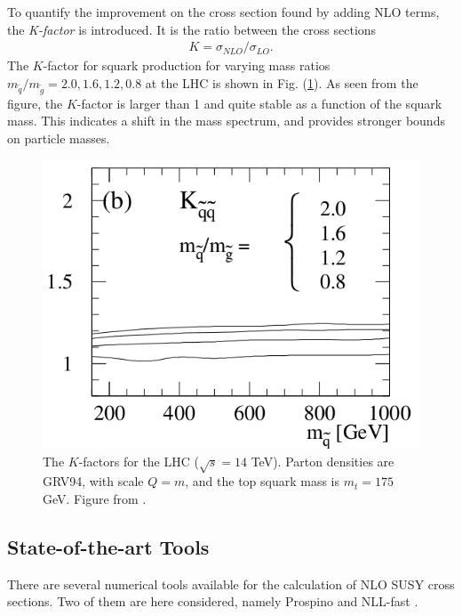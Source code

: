 \documentclass[twoside,english]{uiofysmaster}
\begin{document}
To quantify the improvement on the cross section found by adding NLO terms, the \textit{K-factor} is introduced. It is the ratio between the cross sections
\begin{align}
K = \sigma_{NLO}/\sigma_{LO}.
\end{align}
The $K$-factor for squark production for varying mass ratios $m_{\tilde{q}}/m_{\tilde{g}}=2.0, 1.6,1.2,0.8$ at the LHC is shown in Fig. (\ref{Fig:: susy hadron : K-factor LHC}). As seen from the figure, the $K$-factor is larger than 1 and quite stable as a function of the squark mass. This indicates a shift in the mass spectrum, and provides stronger bounds on particle masses.

\begin{figure}
\centering
\includegraphics[scale=0.5]{squark_gluino_K_factor.png}
\caption{The $K$-factors for the LHC ($\sqrt{s}=14$ TeV). Parton densities are GRV94, with scale $Q=m$, and the top squark mass is $m_t=175$ GeV. Figure from \cite{beenakker1997squark}.}
\label{Fig:: susy hadron : K-factor LHC}
\end{figure}


\subsection{State-of-the-art Tools}

There are several numerical tools available for the calculation of NLO SUSY cross sections. Two of them are here considered, namely Prospino \cite{beenakker1996prospino} and NLL-fast \cite{beenakker2016nlo+}.
\end{document}
